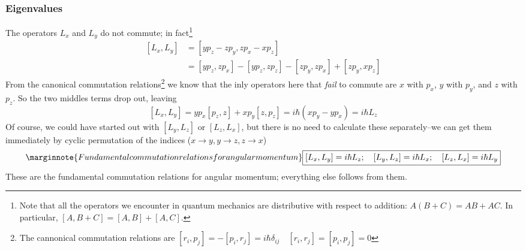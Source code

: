 \subsubsection{Eigenvalues}
The operators $L_x$ and $L_y$ do not commute; in fact\footnote{Note that all the operators we encounter in quantum mechanics are distributive with respect to addition: $A(B+C)=AB +AC$. In particular, $[A,B+C]=[A,B]+[A,C]$.}
\begin{align}
	\nonumber [L_x,L_y]&=[yp_z-zp_y, zp_x-xp_z]\\
										 &=[yp_z,zp_x]-[yp_z,zp_z]-[zp_y,zp_x]+[zp_y,xp_z]\label{4.97}
\end{align}
From the canonical commutation relations\footnote{The cannonical commutation relations are $[r_i,p_j]=-[p_i,r_j]=i\hbar\delta_{ij}\quad [r_i,r_j]=[p_i,p_j]=0$} we know that the inly operators here that \textit{fail} to commute are $x$ with $p_x$, $y$ with $p_y$, and $z$ with $p_z$. So the two middles terms drop out, leaving
\begin{equation}\label{4.98}
	[L_x,L_y]=yp_x[p_z,z]+xp_y[z,p_z]=i\hbar(xp_y-yp_x)=i\hbar L_z
\end{equation}
Of course, we could have started out with $[L_y,L_z]$ or $[L_z,L_x]$, but there is no need to calculate these separately--we can get them immediately by cyclic permutation of the indices ($x\to y, y\to z, z\to x$)
\begin{equation}\label{4.99}\marginnote{Fundamental commutation relations for angular momentum}
	\boxed{[L_x,L_y]=i\hbar L_z;\quad [L_y,L_z]=i\hbar L_x;\quad [L_z,L_x]=i\hbar L_y}
\end{equation}
These are the fundamental commutation relations for angular momentum; everything else follows from them.

